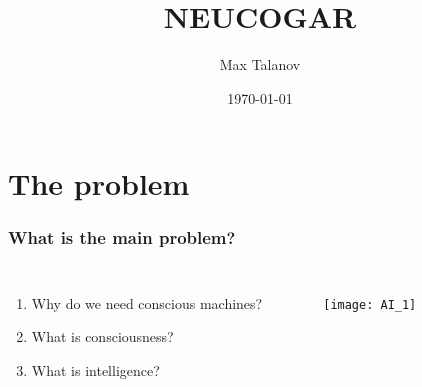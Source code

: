 \documentclass[12pt, aspectratio=169]{beamer}
\title[NEUCOGAR]{NEUCOGAR} %
\author{Max Talanov} %
\institute[IR ITIS KFU] %
{
IR ITIS KFU \\ %
\medskip
\textit{max.talanov@gmail.com} %
}
\date{\today} %
\begin{document}
\begin{frame}
\titlepage %
\end{frame}



\section{The problem} %

\begin{frame}
\frametitle{What is the main problem?}
\begin{columns}[c] %

\begin{enumerate}
\item Why do we need conscious machines?
\item What is consciousness?
\item What is intelligence?
\end{enumerate}

\begin{figure}
\texttt{[image: AI\_1]}
\end{figure}
\end{columns}
\end{frame}

\end{document}
